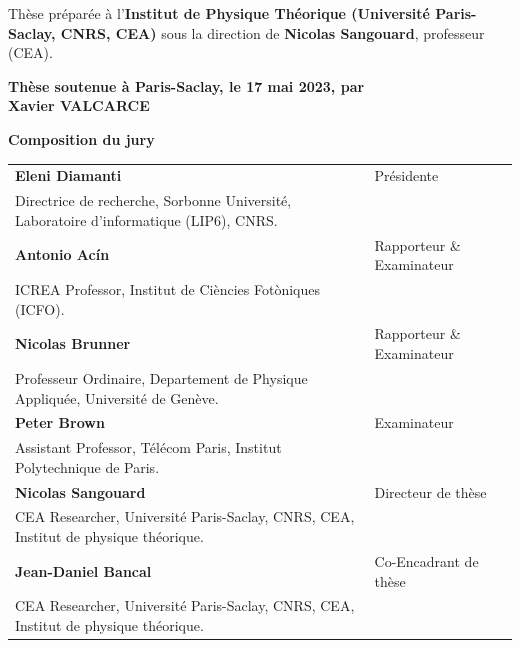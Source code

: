 \documentclass[french,12pt,a4paper]{book}
\begin{document}
\begin{titlepage}
		\footnotesize Thèse préparée à l’\textbf{Institut de Physique Théorique (Université Paris-Saclay, CNRS, CEA)} sous la direction de \textbf{Nicolas Sangouard}, professeur (CEA). \\
		\vspace{15mm}
		
		\textbf{Thèse soutenue à Paris-Saclay, le 17 mai 2023, par}\\
		\bigskip
		\Large {\color{Prune} \textbf{Xavier VALCARCE}}
		
		\vspace{\fill} %
		
		\bigskip
		
		\flushleft
		\small \textbf{Composition du jury}\\
		\vspace{2mm}
		\scriptsize
		\begin{tabular}{|p{7cm}l}
			\arrayrulecolor{Prune}
			\textbf{Eleni Diamanti} & Présidente\\ 
			Directrice de recherche, Sorbonne Université, Laboratoire d'informatique (LIP6), CNRS. & \\
			\textbf{Antonio Ac\'in} &  Rapporteur \& Examinateur \\ 
			ICREA Professor, Institut de Ciències Fotòniques (ICFO).   &   \\ 
			\textbf{Nicolas Brunner} &  Rapporteur \& Examinateur \\ 
			Professeur Ordinaire, Departement de Physique Appliquée, Université de Genève.  &   \\ 
			\textbf{Peter Brown} &  Examinateur \\ 
			Assistant Professor, Télécom Paris, Institut Polytechnique de Paris.   &   \\ 
			\textbf{Nicolas Sangouard} &  Directeur de thèse \\ 
			CEA Researcher, Université Paris-Saclay, CNRS, CEA, Institut de physique théorique.   &   \\ 
			\textbf{Jean-Daniel Bancal} &  Co-Encadrant de thèse \\ 
			CEA Researcher, Université Paris-Saclay, CNRS, CEA, Institut de physique théorique.   &   
		\end{tabular} 
		
	\end{titlepage}

\Ifthispageodd{\newpage\thispagestyle{empty}\null\newpage}{}
\thispagestyle{empty}
\selectfont
\end{document}
